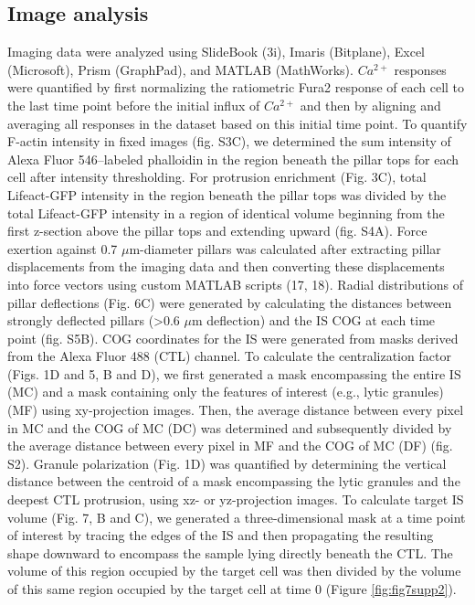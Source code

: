 \subsection{Image analysis}
Imaging data were analyzed using SlideBook (3i), Imaris (Bitplane), Excel (Microsoft), Prism (GraphPad), and MATLAB (MathWorks). $Ca^{2+}$ responses were quantified by first normalizing the ratiometric Fura2 response of each cell to the last time point before the initial influx of $Ca^{2+}$ and then by aligning and averaging all responses in the dataset based on this initial time point. To quantify F-actin intensity in fixed images (fig. S3C), we determined the sum intensity of Alexa Fluor 546–labeled phalloidin in the region beneath the pillar tops for each cell after intensity thresholding. For protrusion enrichment (Fig. 3C), total Lifeact-GFP intensity in the region beneath the pillar tops was divided by the total Lifeact-GFP intensity in a region of identical volume beginning from the first z-section above the pillar tops and extending upward (fig. S4A). Force exertion against 0.7 $\mu$m-diameter pillars was calculated after extracting pillar displacements from the imaging data and then converting these displacements into force vectors using custom MATLAB scripts (17, 18). Radial distributions of pillar deflections (Fig. 6C) were generated by calculating the distances between strongly deflected pillars (>0.6 $\mu$m deflection) and the IS COG at each time point (fig. S5B). COG coordinates for the IS were generated from masks derived from the Alexa Fluor 488 (CTL) channel. To calculate the centralization factor (Figs. 1D and 5, B and D), we first generated a mask encompassing the entire IS (MC) and a mask containing only the features of interest (e.g., lytic granules) (MF) using xy-projection images. Then, the average distance between every pixel in MC and the COG of MC (DC) was determined and subsequently divided by the average distance between every pixel in MF and the COG of MC (DF) (fig. S2). Granule polarization (Fig. 1D) was quantified by determining the vertical distance between the centroid of a mask encompassing the lytic granules and the deepest CTL protrusion, using xz- or yz-projection images. To calculate target IS volume (Fig. 7, B and C), we generated a three-dimensional mask at a time point of interest by tracing the edges of the IS and then propagating the resulting shape downward to encompass the sample lying directly beneath the CTL. The volume of this region occupied by the target cell was then divided by the volume of this same region occupied by the target cell at time 0 (Figure \ref{fig:fig7supp2}).


